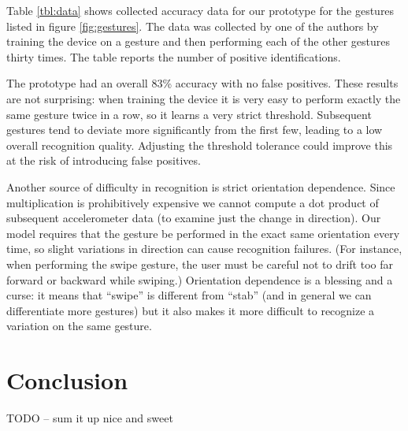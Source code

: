 \documentclass[12pt]{article}
\begin{document}
Table \ref{tbl:data} shows collected accuracy data for our prototype for the
gestures listed in figure \ref{fig:gestures}. The data was collected by one of
the authors by training the device on a gesture and then performing each of
the other gestures thirty times. The table reports the number of positive
identifications.

The prototype had an overall 83\% accuracy with no false positives. These
results are not surprising: when training the device it is very easy to perform
exactly the same gesture twice in a row, so it learns a very strict threshold.
Subsequent gestures tend to deviate more significantly from the first few,
leading to a low overall recognition quality. Adjusting the threshold tolerance
could improve this at the risk of introducing false positives.

Another source of difficulty in recognition is strict orientation dependence.
Since multiplication is prohibitively expensive we cannot compute a dot product
of subsequent accelerometer data (to examine just the change in direction). Our
model requires that the gesture be performed in the exact same orientation
every time, so slight variations in direction can cause recognition failures.
(For instance, when performing the swipe gesture, the user must be careful not
to drift too far forward or backward while swiping.) Orientation dependence is
a blessing and a curse: it means that ``swipe'' is different from ``stab'' (and
in general we can differentiate more gestures) but it also makes it more
difficult to recognize a variation on the same gesture.

\section{Conclusion}

TODO -- sum it up nice and sweet



\end{document}
